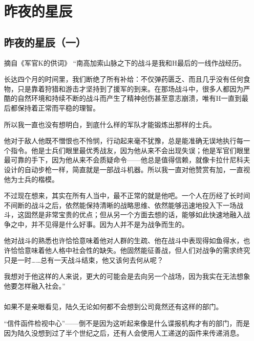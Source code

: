 \part{昨夜的星辰}
\chapter{昨夜的星辰（一）}


\begin{QuoteEnv}[关于H的精神状态和战斗表现]{摘自《军官K的供词》}
“南高加索山脉之下的战斗是我和H最后的一线作战经历。

长达四个月的时间里，我们断绝了所有补给：不仅弹药匮乏、而且几乎没有任何食物，只是靠着狩猎和游击才坚持到了援军的到来。在那场战斗中，很多人都因为严酷的自然环境和持续不断的战斗而产生了精神创伤甚至意志崩溃，唯有H一直到最后都保持着正常而平稳的理智。

所以我一直也没有想明白，到底什么样的军队才能锻炼出那样的士兵。

他对于敌人他既不憎恨也不怜悯，行动起来毫不犹豫，总是能准确无误地执行每一个指令。他是士兵们眼里最优秀战友，因为他从来不会出现失误；他是军官们眼里最可靠的手下，因为他从来不会质疑命令——他总是值得信赖，就像卡拉什尼科夫设计的自动步枪一样，简直就是一部战斗机器。所以我一直对他赞赏有加，一直视他为士兵的楷模。

不过现在想来，其实在所有人当中，最不正常的就是他吧。一个人在历经了长时间不间断的战斗之后，依然能保持清晰的战略思维、依然能够迅速地投入下一场战斗，这固然是非常宝贵的优点；但从另一个方面去想的话，能够如此快速地融入战争之中，并不见得是什么好事。因为人并不是为战争而生的。

他对战斗的熟悉也许恰恰意味着他对人群的生疏、他在战斗中表现得如鱼得水，也许恰恰意味着他人格中社会性的缺失。他固然能征善战，但人们对战争的需求终究只是一时……总有一天战斗结束，他又该何去何从呢？

我想对于他这样的人来说，更大的可能会是去向另一个战场，因为我实在无法想象他要怎样融入社会。”

\end{QuoteEnv}








\section*{}

如果不是亲眼看见，陆久无论如何都不会想到公司竟然还有这样的部门。

“信件函件检视中心”——倒不是因为这听起来像是什么谍报机构才有的部门，而是因为陆久没想到过了半个世纪之后，还有人会使用人工递送的函件来传递消息。

